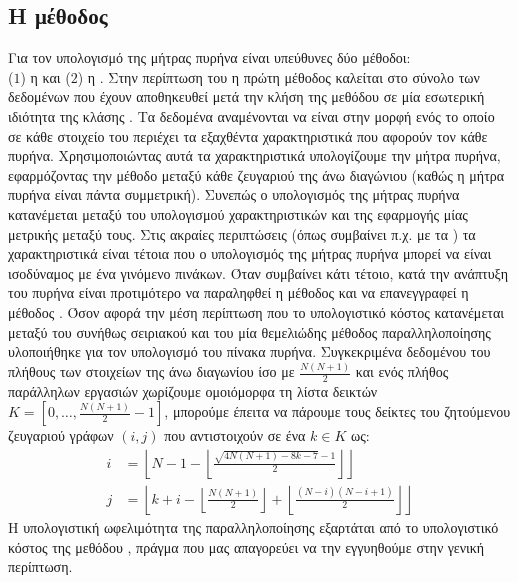 \subsection{Η μέθοδος \texttt{}}
Για τον υπολογισμό της μήτρας πυρήνα είναι υπεύθυνες δύο μέθοδοι:\\ ($1$) η \texttt{} και ($2$) η \texttt{}.
Στην περίπτωση του \texttt{} η πρώτη μέθοδος καλείται στο σύνολο των δεδομένων που έχουν αποθηκευθεί μετά την κλήση της μεθόδου \texttt{} σε μία εσωτερική ιδιότητα της κλάσης \texttt{}.
Τα δεδομένα αναμένονται να είναι στην μορφή ενός \texttt{} το οποίο σε κάθε στοιχείο του περιέχει τα εξαχθέντα χαρακτηριστικά που αφορούν τον κάθε πυρήνα.
Χρησιμοποιώντας αυτά τα χαρακτηριστικά υπολογίζουμε την μήτρα πυρήνα, εφαρμόζοντας την μέθοδο \texttt{} μεταξύ κάθε ζευγαριού της άνω διαγώνιου (καθώς η μήτρα πυρήνα είναι πάντα συμμετρική).
Συνεπώς ο υπολογισμός της μήτρας πυρήνα κατανέμεται μεταξύ του υπολογισμού χαρακτηριστικών και της εφαρμογής μίας μετρικής μεταξύ τους.
Στις ακραίες περιπτώσεις (όπως συμβαίνει π.χ. με τα ) τα χαρακτηριστικά είναι τέτοια που ο υπολογισμός της μήτρας πυρήνα μπορεί να είναι ισοδύναμος με ένα γινόμενο πινάκων.
Όταν συμβαίνει κάτι τέτοιο, κατά την ανάπτυξη του πυρήνα είναι προτιμότερο να παραληφθεί η μέθοδος \texttt{} και να επανεγγραφεί η μέθοδος \texttt{}.
Όσον αφορά την μέση περίπτωση που το υπολογιστικό κόστος κατανέμεται μεταξύ του συνήθως σειριακού \texttt{} και του \texttt{} μία θεμελιώδης μέθοδος παραλληλοποίησης υλοποιήθηκε για τον υπολογισμό του πίνακα πυρήνα.
Συγκεκριμένα δεδομένου του πλήθους των στοιχείων της άνω διαγωνίου ίσο με $\frac{N(N+1)}{2}$ και ενός πλήθος παράλληλων εργασιών \texttt{} χωρίζουμε ομοιόμορφα τη λίστα δεικτών $K = [0, \dots, \frac{N(N+1)}{2}-1]$, μπορούμε έπειτα να πάρουμε τους δείκτες του ζητούμενου ζευγαριού γράφων $(i,j)$ που αντιστοιχούν σε ένα $k \in K$ ως:
\begin{align}
    i &= \left\lfloor N - 1 - \left\lfloor \frac{\sqrt{4N(N+1) - 8k - 7} - 1}{2}\right\rfloor \right\rfloor\\
    j &= \left\lfloor k + i - \left\lfloor \frac{N(N+1)}{2} \right\rfloor + \left\lfloor \frac{(N-i)(N-i+1)}{2} \right\rfloor \right\rfloor
\end{align}
Η υπολογιστική ωφελιμότητα της παραλληλοποίησης εξαρτάται από το υπολογιστικό κόστος της μεθόδου \texttt{}, πράγμα που μας απαγορεύει να την εγγυηθούμε στην γενική περίπτωση.

